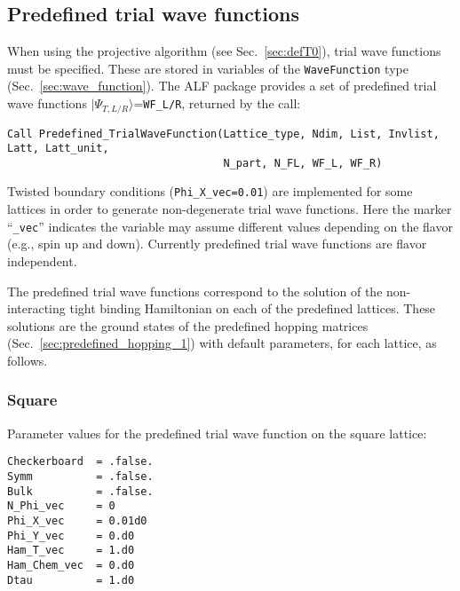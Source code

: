 

\subsection{Predefined trial wave functions} \label{sec:predefined_trial_wave_function}

When using the projective algorithm (see Sec.~\ref{sec:defT0}), trial wave functions must be specified.
These are stored in variables of the \texttt{WaveFunction} type (Sec.~\ref{sec:wave_function}).
The ALF package provides a set of predefined trial wave functions $|\Psi_{T,L/R}\rangle$=\texttt{WF\_L/R}, returned by the call:

\begin{lstlisting}[style=fortran]
Call Predefined_TrialWaveFunction(Lattice_type, Ndim, List, Invlist, Latt, Latt_unit,
                                  N_part, N_FL, WF_L, WF_R)
\end{lstlisting}
Twisted boundary conditions (\texttt{Phi\_X\_vec=0.01}) are implemented for some lattices in order to generate non-degenerate trial wave functions. Here the marker ``\texttt{\_vec}'' indicates the variable may assume different values depending on the flavor (e.g., spin up and down). Currently predefined trial wave functions are flavor independent.

The predefined trial wave functions correspond to the solution of the non-interacting tight binding Hamiltonian on each of the predefined lattices. These solutions are the ground states of the predefined hopping matrices (Sec.~\ref{sec:predefined_hopping_1}) with default parameters, for each lattice, as follows.

\subsubsection{Square}

Parameter values for the predefined trial wave function on the square lattice:
\begin{lstlisting}[style=fortran]
Checkerboard  = .false.
Symm          = .false.
Bulk          = .false.
N_Phi_vec     = 0
Phi_X_vec     = 0.01d0
Phi_Y_vec     = 0.d0
Ham_T_vec     = 1.d0
Ham_Chem_vec  = 0.d0
Dtau          = 1.d0
\end{lstlisting}


